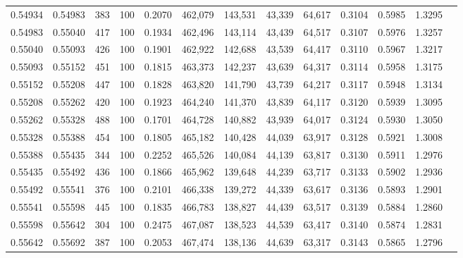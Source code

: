 \begin{tabular}{rrrrrrrrrrrrr}
0.54934 & 0.54983 &   383 & 100 &                                     0.2070 & 462,079 & 143,531 &  43,339 &  64,617 & 0.3104 & 0.5985 & 1.3295 \\
0.54983 & 0.55040 &   417 & 100 &                                     0.1934 & 462,496 & 143,114 &  43,439 &  64,517 & 0.3107 & 0.5976 & 1.3257 \\
0.55040 & 0.55093 &   426 & 100 &                                     0.1901 & 462,922 & 142,688 &  43,539 &  64,417 & 0.3110 & 0.5967 & 1.3217 \\
0.55093 & 0.55152 &   451 & 100 &                                     0.1815 & 463,373 & 142,237 &  43,639 &  64,317 & 0.3114 & 0.5958 & 1.3175 \\
0.55152 & 0.55208 &   447 & 100 &                                     0.1828 & 463,820 & 141,790 &  43,739 &  64,217 & 0.3117 & 0.5948 & 1.3134 \\
0.55208 & 0.55262 &   420 & 100 &                                     0.1923 & 464,240 & 141,370 &  43,839 &  64,117 & 0.3120 & 0.5939 & 1.3095 \\
0.55262 & 0.55328 &   488 & 100 &                                     0.1701 & 464,728 & 140,882 &  43,939 &  64,017 & 0.3124 & 0.5930 & 1.3050 \\
0.55328 & 0.55388 &   454 & 100 &                                     0.1805 & 465,182 & 140,428 &  44,039 &  63,917 & 0.3128 & 0.5921 & 1.3008 \\
0.55388 & 0.55435 &   344 & 100 &                                     0.2252 & 465,526 & 140,084 &  44,139 &  63,817 & 0.3130 & 0.5911 & 1.2976 \\
0.55435 & 0.55492 &   436 & 100 &                                     0.1866 & 465,962 & 139,648 &  44,239 &  63,717 & 0.3133 & 0.5902 & 1.2936 \\
0.55492 & 0.55541 &   376 & 100 &                                     0.2101 & 466,338 & 139,272 &  44,339 &  63,617 & 0.3136 & 0.5893 & 1.2901 \\
0.55541 & 0.55598 &   445 & 100 &                                     0.1835 & 466,783 & 138,827 &  44,439 &  63,517 & 0.3139 & 0.5884 & 1.2860 \\
0.55598 & 0.55642 &   304 & 100 &                                     0.2475 & 467,087 & 138,523 &  44,539 &  63,417 & 0.3140 & 0.5874 & 1.2831 \\
0.55642 & 0.55692 &   387 & 100 &                                     0.2053 & 467,474 & 138,136 &  44,639 &  63,317 & 0.3143 & 0.5865 & 1.2796 \\

\end{tabular}
